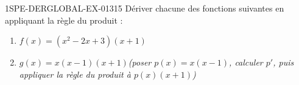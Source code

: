 \begin{exercice}{1SPE-DERGLOBAL-EX-013}{1}{5}
Dériver chacune des fonctions suivantes en appliquant la règle du produit :
\begin{enumerate}
  \item $f(x) = (x^2 - 2x + 3)(x+1)$
  \item $g(x) = x(x-1)(x+1)$\quad\textit{(poser $p(x)=x(x-1)$, calculer $p'$, puis appliquer la règle du produit à $p(x)(x+1)$)}
\end{enumerate}
\end{exercice}
